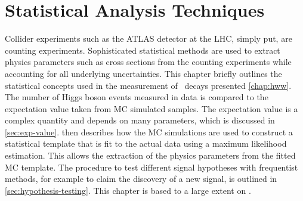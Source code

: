 \chapter{Statistical Analysis Techniques}
\label{chap:statistics}
Collider experiments such as the ATLAS detector at the LHC, simply put, are counting experiments. 
Sophisticated statistical methods are used to extract physics parameters such as cross sections from the counting experiments while accounting for all underlying uncertainties. 
This chapter briefly outlines the statistical concepts used in the measurement of \HWW\ decays presented \cref{chap:hww}.
The number of Higgs boson events measured in data is compared to the expectation value taken from MC simulated samples. The expectation value is a complex quantity and depends on many parameters, which is discussed in \cref{sec:exp-value}.
 then describes how the MC simulations are used to construct a statistical template that is fit to the actual data using a maximum likelihood estimation. This allows the extraction of the physics parameters from the fitted MC template.
The procedure to test different signal hypotheses with frequentist methods, for example to claim the discovery of a new signal, is outlined in \cref{sec:hypothesis-testing}.
This chapter is based to a large extent on .

